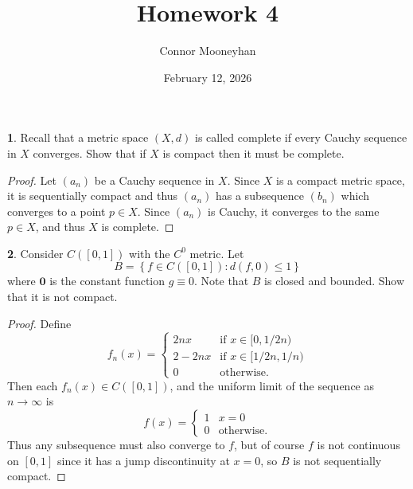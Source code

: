 \documentclass[12pt]{article}
\title{Homework 4}
\author{Connor Mooneyhan}
\date{February 12, 2026}
\theoremstyle{definition}
\newtheorem{ex}{}
\begin{document}
\maketitle

\begin{ex}
	Recall that a metric space $(X, d)$ is called complete if every Cauchy sequence in $X$ converges.
	Show that if $X$ is compact then it must be complete.
\end{ex}
\begin{proof}
	Let $(a_n)$ be a Cauchy sequence in $X$.
	Since $X$ is a compact metric space, it is sequentially compact and thus $(a_n)$ has a subsequence $(b_n)$ which converges to a point $p \in X$.
	Since $(a_n)$ is Cauchy, it converges to the same $p \in X$, and thus $X$ is complete.

\end{proof}

\begin{ex}
	Consider $C([0, 1])$ with the $C^0$ metric.
	Let \begin{equation*}
		B = \left\lbrace f \in C([0, 1]) : d(f, 0) \leq 1 \right\rbrace
	\end{equation*}
	where $\mathbf{0}$ is the constant function $g \equiv 0$.
	Note that $B$ is closed and bounded.
	Show that it is not compact.
\end{ex}
\begin{proof}
	Define \begin{equation*}
		f_n(x) = \begin{cases}
			2nx     & \text{if } x \in [0, 1/2n)   \\
			2 - 2nx & \text{if } x \in [1/2n, 1/n) \\
			0       & \text{otherwise.}
		\end{cases}
	\end{equation*}
	Then each $f_n(x) \in C([0,1])$, and the uniform limit of the sequence as $n \to \infty$ is \begin{equation*}
		f(x) = \begin{cases}
			1 & x = 0             \\
			0 & \text{otherwise.}
		\end{cases}
	\end{equation*}
	Thus any subsequence must also converge to $f$, but of course $f$ is not continuous on $[0, 1]$ since it has a jump discontinuity at $x = 0$, so $B$ is not sequentially compact.
\end{proof}
\end{document}
